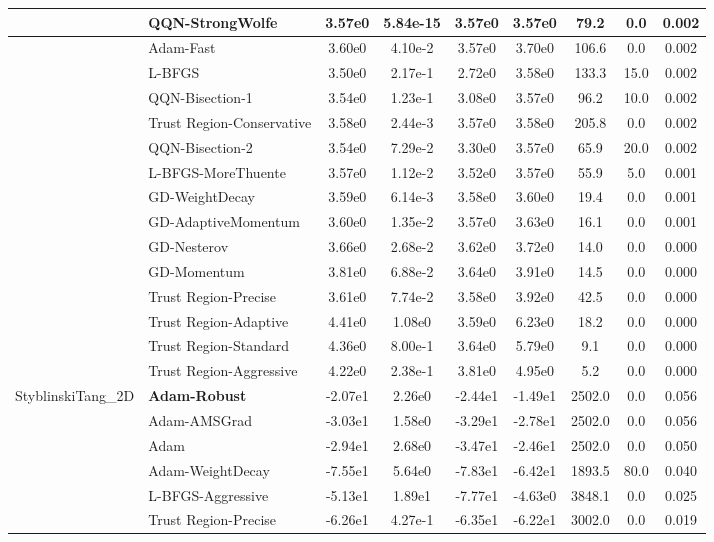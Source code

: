 \documentclass{article}
\begin{document}
\begin{longtable}{|l|l|c|c|c|c|c|c|c|}
 & QQN-StrongWolfe & 3.57e0 & 5.84e-15 & 3.57e0 & 3.57e0 & 79.2 & 0.0 & 0.002 \\
\hline
 & Adam-Fast & 3.60e0 & 4.10e-2 & 3.57e0 & 3.70e0 & 106.6 & 0.0 & 0.002 \\
\hline
 & L-BFGS & 3.50e0 & 2.17e-1 & 2.72e0 & 3.58e0 & 133.3 & 15.0 & 0.002 \\
\hline
 & QQN-Bisection-1 & 3.54e0 & 1.23e-1 & 3.08e0 & 3.57e0 & 96.2 & 10.0 & 0.002 \\
\hline
 & Trust Region-Conservative & 3.58e0 & 2.44e-3 & 3.57e0 & 3.58e0 & 205.8 & 0.0 & 0.002 \\
\hline
 & QQN-Bisection-2 & 3.54e0 & 7.29e-2 & 3.30e0 & 3.57e0 & 65.9 & 20.0 & 0.002 \\
\hline
 & L-BFGS-MoreThuente & 3.57e0 & 1.12e-2 & 3.52e0 & 3.57e0 & 55.9 & 5.0 & 0.001 \\
\hline
 & GD-WeightDecay & 3.59e0 & 6.14e-3 & 3.58e0 & 3.60e0 & 19.4 & 0.0 & 0.001 \\
\hline
 & GD-AdaptiveMomentum & 3.60e0 & 1.35e-2 & 3.57e0 & 3.63e0 & 16.1 & 0.0 & 0.001 \\
\hline
 & GD-Nesterov & 3.66e0 & 2.68e-2 & 3.62e0 & 3.72e0 & 14.0 & 0.0 & 0.000 \\
\hline
 & GD-Momentum & 3.81e0 & 6.88e-2 & 3.64e0 & 3.91e0 & 14.5 & 0.0 & 0.000 \\
\hline
 & Trust Region-Precise & 3.61e0 & 7.74e-2 & 3.58e0 & 3.92e0 & 42.5 & 0.0 & 0.000 \\
\hline
 & Trust Region-Adaptive & 4.41e0 & 1.08e0 & 3.59e0 & 6.23e0 & 18.2 & 0.0 & 0.000 \\
\hline
 & Trust Region-Standard & 4.36e0 & 8.00e-1 & 3.64e0 & 5.79e0 & 9.1 & 0.0 & 0.000 \\
\hline
 & Trust Region-Aggressive & 4.22e0 & 2.38e-1 & 3.81e0 & 4.95e0 & 5.2 & 0.0 & 0.000 \\
StyblinskiTang\_2D & \textbf{Adam-Robust} & -2.07e1 & 2.26e0 & -2.44e1 & -1.49e1 & 2502.0 & 0.0 & 0.056 \\
\hline
 & Adam-AMSGrad & -3.03e1 & 1.58e0 & -3.29e1 & -2.78e1 & 2502.0 & 0.0 & 0.056 \\
\hline
 & Adam & -2.94e1 & 2.68e0 & -3.47e1 & -2.46e1 & 2502.0 & 0.0 & 0.050 \\
\hline
 & Adam-WeightDecay & -7.55e1 & 5.64e0 & -7.83e1 & -6.42e1 & 1893.5 & 80.0 & 0.040 \\
\hline
 & L-BFGS-Aggressive & -5.13e1 & 1.89e1 & -7.77e1 & -4.63e0 & 3848.1 & 0.0 & 0.025 \\
\hline
 & Trust Region-Precise & -6.26e1 & 4.27e-1 & -6.35e1 & -6.22e1 & 3002.0 & 0.0 & 0.019 \\

\end{longtable}
\end{document}
